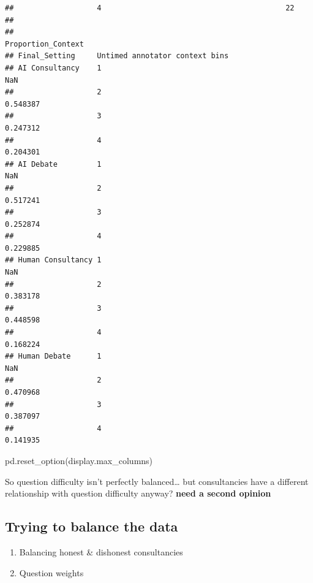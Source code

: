 \documentclass[
]{article}
\newenvironment{Shaded}{\begin{snugshade}}{\end{snugshade}}
\newcommand{\NormalTok}[1]{#1}
\newcommand{\StringTok}[1]{\textcolor[rgb]{0.31,0.60,0.02}{#1}}
\providecommand{\tightlist}{%
  \setlength{\itemsep}{0pt}\setlength{\parskip}{0pt}}
\begin{document}
\begin{verbatim}
##                   4                                          22   
## 
##                                                   Proportion_Context  
## Final_Setting     Untimed annotator context bins                      
## AI Consultancy    1                                              NaN  
##                   2                                         0.548387  
##                   3                                         0.247312  
##                   4                                         0.204301  
## AI Debate         1                                              NaN  
##                   2                                         0.517241  
##                   3                                         0.252874  
##                   4                                         0.229885  
## Human Consultancy 1                                              NaN  
##                   2                                         0.383178  
##                   3                                         0.448598  
##                   4                                         0.168224  
## Human Debate      1                                              NaN  
##                   2                                         0.470968  
##                   3                                         0.387097  
##                   4                                         0.141935
\end{verbatim}

\begin{Shaded}
\begin{Highlighting}[]
\NormalTok{pd.reset\_option(}\StringTok{\textquotesingle{}display.max\_columns\textquotesingle{}}\NormalTok{)}
\end{Highlighting}
\end{Shaded}

So question difficulty isn't perfectly balanced\ldots{} but
consultancies have a different relationship with question difficulty
anyway? \textbf{need a second opinion}

\subsection{Trying to balance the
data}\label{trying-to-balance-the-data}

\begin{enumerate}
\def\labelenumi{\arabic{enumi}.}
\tightlist
\item
  Balancing honest \& dishonest consultancies
\item
  Question weights
\end{enumerate}
\end{document}
